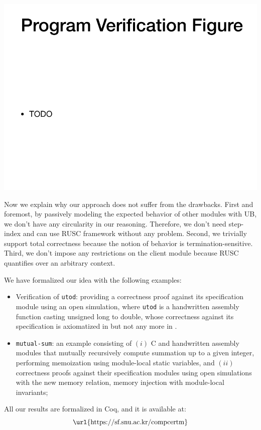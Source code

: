 \includegraphics[width=0.6\linewidth]{fig-program-verif.png}

\noindent Now we explain why our approach does not suffer from the drawbacks.
First and foremost, by passively modeling the expected behavior of other modules with UB, we don't have any circularity in our reasoning. Therefore, we don't need step-index and can use RUSC framework without any problem.
Second, we trivially support total correctness because the notion of behavior is termination-sensitive.
Third, we don't impose any restrictions on the client module because RUSC quantifies over an arbitrary context.


We have formalized our idea with the following examples:
\begin{itemize}
\item Verification of \texttt{utod}: providing a correctness proof
  against its specification module using an open simulation,
  where \texttt{utod} is a handwritten
  assembly function casting unsigned long to double, whose correctness
  against its specification is axiomatized in \cc{} but not any more
  in \ccm{}.
\item \texttt{mutual-sum}: an example consisting of $(i)$ C and
  handwritten assembly modules that mutually recursively compute
  summation up to a given integer, performing memoization using
  module-local static variables, and $(ii)$ correctness proofs
  against their specification modules using open simulations with the
  new memory relation, memory injection with module-local invariants;
\end{itemize}
\medskip



\bigskip
All our results are formalized in Coq, and it is available at: \[ \text{\url{https://sf.snu.ac.kr/compcertm}} \]

